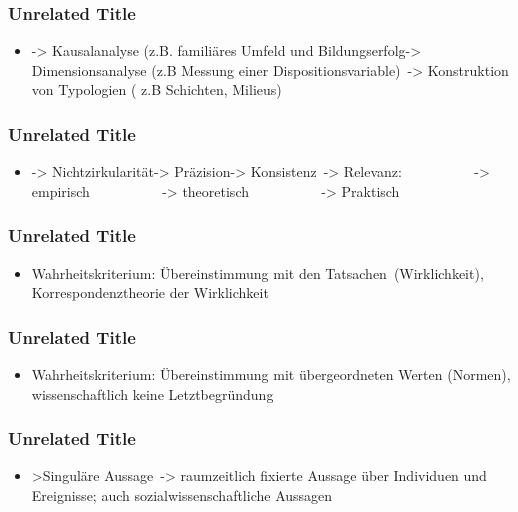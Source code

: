\documentclass[aspectratio=169]{beamer}
\begin{document}
\begin{frame}
\frametitle{Unrelated Title}


\begin{itemize}
\item -> Kausalanalyse (z.B. familiäres Umfeld und Bildungserfolg-> Dimensionsanalyse (z.B Messung einer Dispositionsvariable) -> Konstruktion von Typologien ( z.B Schichten, Milieus) 
\end{itemize}

\note[item]{}
\end{frame}
\begin{frame}
\frametitle{Unrelated Title}


\begin{itemize}
\item -> Nichtzirkularität-> Präzision-> Konsistenz -> Relevanz:            -> empirisch            -> theoretisch            -> Praktisch  
\end{itemize}

\note[item]{}
\end{frame}
\begin{frame}
\frametitle{Unrelated Title}


\begin{itemize}
\item Wahrheitskriterium: Übereinstimmung mit den Tatsachen (Wirklichkeit), Korrespondenztheorie der Wirklichkeit 
\end{itemize}

\note[item]{}
\end{frame}
\begin{frame}
\frametitle{Unrelated Title}


\begin{itemize}
\item Wahrheitskriterium: Übereinstimmung mit übergeordneten Werten (Normen), wissenschaftlich keine Letztbegründung 
\end{itemize}

\note[item]{}
\end{frame}
\begin{frame}
\frametitle{Unrelated Title}


\begin{itemize}
\item >Singuläre Aussage -> raumzeitlich fixierte Aussage über Individuen und Ereignisse; auch sozialwissenschaftliche Aussagen 
\end{itemize}

\note[item]{}
\end{frame}
\end{document}
